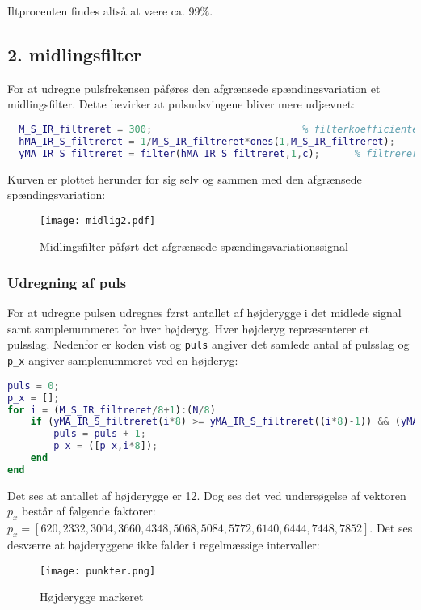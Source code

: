 \documentclass{article}
\begin{document}
Iltprocenten findes altså at være ca. 99\%.

\subsection{2. midlingsfilter}
\label{sec:andet-midlingsfilter}

For at udregne pulsfrekensen påføres den afgrænsede spændingsvariation et midlingsfilter. Dette bevirker at pulsudsvingene bliver mere udjævnet:
\begin{lstlisting}[language=Matlab,basicstyle=\tiny]
  % IR lampesignal
  M_S_IR_filtreret = 300;                          % filterkoefficienter
  hMA_IR_S_filtreret = 1/M_S_IR_filtreret*ones(1,M_S_IR_filtreret);          % MA-filter, filterkoefficienter
  yMA_IR_S_filtreret = filter(hMA_IR_S_filtreret,1,c);      % filtrerer inputsignal for Simons del
\end{lstlisting}

Kurven er plottet herunder for sig selv og sammen med den afgrænsede spændingsvariation:

\begin{figure}[h]
  \centering
  \texttt{[image: midlig2.pdf]}
  \caption{Midlingsfilter påført det afgrænsede spændingsvariationssignal}
  \label{fig:midlig2}
\end{figure}

\subsubsection{Udregning af puls}
\label{sec:udregning-af-puls}

For at udregne pulsen udregnes først antallet af højderygge i det midlede signal samt samplenummeret for hver højderyg. Hver højderyg repræsenterer et pulsslag. Nedenfor er koden vist og \lstinline{puls} angiver det samlede antal af pulsslag og \lstinline{p_x} angiver samplenummeret ved en højderyg:

\begin{lstlisting}[language=Matlab,basicstyle=\tiny]
puls = 0;
p_x = [];
for i = (M_S_IR_filtreret/8+1):(N/8)
    if (yMA_IR_S_filtreret(i*8) >= yMA_IR_S_filtreret((i*8)-1)) && (yMA_IR_S_filtreret(i*8) >= yMA_IR_S_filtreret((i*8)+1))
        puls = puls + 1;
        p_x = ([p_x,i*8]);
    end
end
\end{lstlisting}

Det ses at antallet af højderygge er 12. Dog ses det ved undersøgelse af vektoren $p_x$ består af følgende faktorer: $p_x=[620, 2332,3004, 3660, 4348, 5068, 5084, 5772, 6140, 6444, 7448, 7852]$. Det ses desværre at højderyggene ikke falder i regelmæssige intervaller:
\clearpage
\begin{figure}[h]
  \centering
  \texttt{[image: punkter.png]}
  \caption{Højderygge markeret}
  \label{fig:punkter}
\end{figure}
\end{document}
